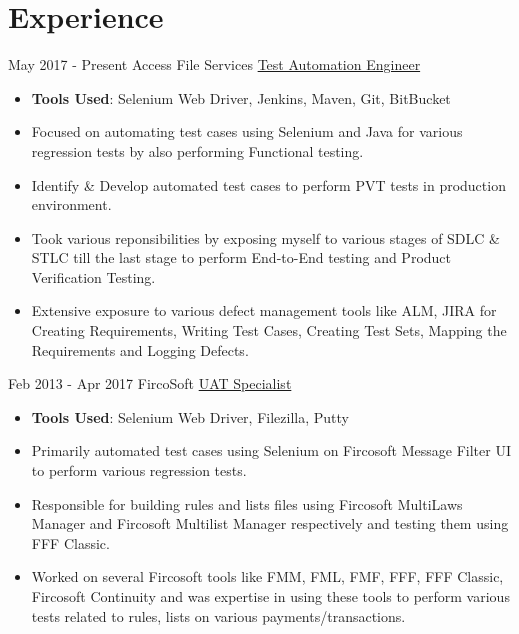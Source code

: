 \documentclass[letterpaper]{twentysecondcv} %
\begin{document}
\section{Experience}
\begin{twenty}
	\twentyitem
    	{May 2017 -}
		{Present}
        {Access File Services}
        {\href{}{Test Automation Engineer}}
        {}
        {
        {\begin{itemize}
        \item \textbf {Tools Used}: Selenium Web Driver, Jenkins, Maven, Git, BitBucket
        \item Focused on automating test cases using Selenium and Java for various regression tests by also performing Functional testing. 
        \item Identify \& Develop automated test cases to perform PVT tests in production environment.
        \item Took various reponsibilities by exposing myself to various stages of SDLC \& STLC till the last stage to perform End-to-End testing and Product Verification Testing. 
        \item Extensive exposure to various defect management tools like ALM, JIRA for Creating Requirements, Writing Test Cases, Creating Test Sets, Mapping the Requirements and Logging Defects. \vspace{2mm}
		\end{itemize}}
        }
	\twentyitem
    	{Feb 2013 -}
		{Apr 2017}
        {FircoSoft}
        {\href{}{UAT Specialist}}
        {}
        {
        {\begin{itemize}
        \item \textbf {Tools Used}: Selenium Web Driver, Filezilla, Putty
        \item Primarily automated test cases using Selenium on Fircosoft Message Filter UI to perform various regression tests.
        \item Responsible for building rules and lists files using Fircosoft MultiLaws Manager and Fircosoft Multilist Manager respectively and testing them using FFF Classic.
        \item Worked on several Fircosoft tools like FMM, FML, FMF, FFF, FFF Classic, Fircosoft Continuity and was expertise in using these tools to perform various tests related to rules, lists on various payments/transactions.
		\end{itemize}}
        }
\end{twenty}
\end{document}
